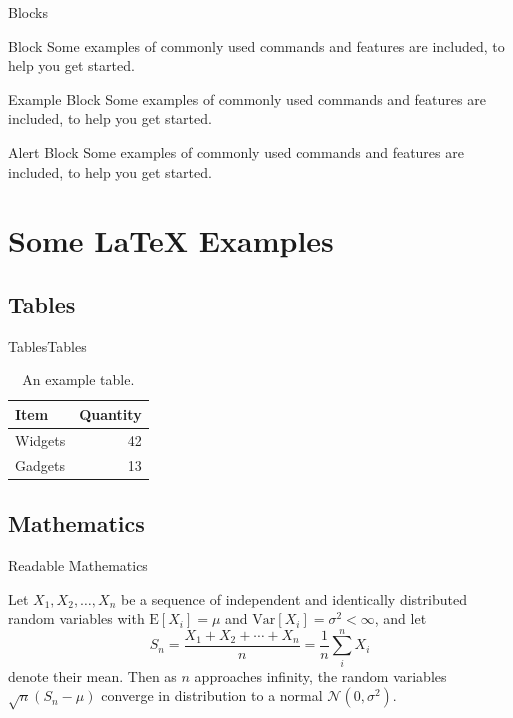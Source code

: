 \documentclass[10pt]{beamer} %
\begin{document}
\begin{frame}{Blocks}

\begin{block}{Block}
Some examples of commonly used commands and features are included, to help you get started.
\end{block}

\begin{exampleblock}{Example Block}
Some examples of commonly used commands and features are included, to help you get started.
\end{exampleblock}

\begin{alertblock}{Alert Block}
Some examples of commonly used commands and features are included, to help you get started.
\end{alertblock}

\end{frame}

\section{Some \LaTeX{} Examples}
\subsection{Tables}

\begin{frame}{Tables}{Tables}

\begin{table}
\centering
\begin{tabular}{l|r}
Item & Quantity \\\hline
Widgets & 42 \\
Gadgets & 13
\end{tabular}
\caption{\label{tab:widgets}An example table.}
\end{table}

\end{frame}

\subsection{Mathematics}

\begin{frame}{Readable Mathematics}

Let $X_1, X_2, \ldots, X_n$ be a sequence of independent and identically distributed random variables with $\text{E}[X_i] = \mu$ and $\text{Var}[X_i] = \sigma^2 < \infty$, and let
$$S_n = \frac{X_1 + X_2 + \cdots + X_n}{n}
      = \frac{1}{n}\sum_{i}^{n} X_i$$
denote their mean. Then as $n$ approaches infinity, the random variables $\sqrt{n}(S_n - \mu)$ converge in distribution to a normal $\mathcal{N}(0, \sigma^2)$.

\end{frame}
\end{document}
